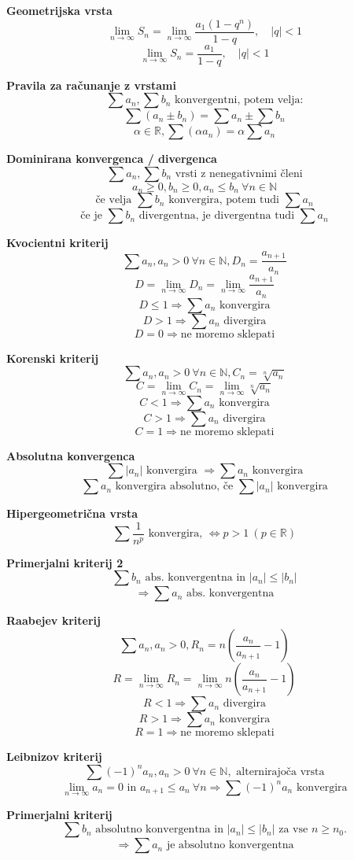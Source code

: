 \textbf{Geometrijska vrsta}
\[
	\lim_{n \to \infty} S_n = \lim_{n \to \infty} \frac{a_1(1-q^n)}{1-q}, \quad |q|<1
\]
\[
	\lim_{n \to \infty} S_n = \frac{a_1}{1-q}, \quad |q|<1
\]

\textbf{Pravila za računanje z vrstami}
\[
	\sum a_n, \sum b_n \text{ konvergentni, potem velja:}
\]
\[
	\sum (a_n \pm b_n) = \sum a_n \pm \sum b_n
\]
\[
	\alpha \in \mathbb{R}, \sum (\alpha a_n) = \alpha \sum a_n
\]

\textbf{Dominirana konvergenca / divergenca}
\[
	\sum a_n, \sum b_n \text{ vrsti z nenegativnimi členi}
\]
\[
	a_n \geq 0, b_n \geq 0, a_n \leq b_n \ \forall n \in \mathbb{N}
\]
\[
	\text{če velja } \sum b_n \text{ konvergira, potem tudi } \sum a_n
\]
\[
	\text{če je } \sum b_n \text{ divergentna, je divergentna tudi } \sum a_n
\]

\textbf{Kvocientni kriterij}
\[
	\sum a_n, a_n>0 \ \forall n \in \mathbb{N}, D_n = \frac{a_{n+1}}{a_n}
\]
\[
	D = \lim_{n \to \infty} D_n = \lim_{n \to \infty} \frac{a_{n+1}}{a_n}
\]
\[
	D \leq 1 \Rightarrow \sum a_n \text{ konvergira}
\]
\[
	D > 1 \Rightarrow \sum a_n \text{ divergira}
\]
\[
	D = 0 \Rightarrow \text{ne moremo sklepati}
\]

\textbf{Korenski kriterij}
\[
	\sum a_n, a_n>0 \ \forall n \in \mathbb{N}, C_n = \sqrt[n]{a_n}
\]
\[
	C = \lim_{n \to \infty} C_n = \lim_{n \to \infty} \sqrt[n]{a_n}
\]
\[
	C < 1 \Rightarrow \sum a_n \text{ konvergira}
\]
\[
	C > 1 \Rightarrow \sum a_n \text{ divergira}
\]
\[
	C = 1 \Rightarrow \text{ne moremo sklepati}
\]

\textbf{Absolutna konvergenca}
\[
	\sum |a_n| \text{ konvergira } \Rightarrow \sum a_n \text{ konvergira}
\]
\[
	\sum a_n \text{ konvergira absolutno, če } \sum |a_n| \text{ konvergira}
\]

\textbf{Hipergeometrična vrsta}
\[
	\sum \frac{1}{n^p} \text{ konvergira, } \Leftrightarrow p>1 \ (p \in \mathbb{R})
\]

\textbf{Primerjalni kriterij 2}
\[
	\sum b_n \text{ abs. konvergentna in } |a_n| \leq |b_n|
\]
\[
	\Rightarrow \sum a_n \text{ abs. konvergentna}
\]

\textbf{Raabejev kriterij}
\[
	\sum a_n, a_n>0, R_n = n \left( \frac{a_n}{a_{n+1}} - 1 \right)
\]
\[
	R = \lim_{n \to \infty} R_n = \lim_{n \to \infty} n \left( \frac{a_n}{a_{n+1}} - 1 \right)
\]
\[
	R < 1 \Rightarrow \sum a_n \text{ divergira}
\]
\[
	R > 1 \Rightarrow \sum a_n \text{ konvergira}
\]
\[
	R = 1 \Rightarrow \text{ne moremo sklepati}
\]

\textbf{Leibnizov kriterij}
\[
	\sum (-1)^n a_n, a_n>0 \ \forall n \in \mathbb{N}, \text{ alternirajoča vrsta}
\]
\[
	\lim_{n \to \infty} a_n = 0 \text{ in } a_{n+1} \leq a_n \ \forall n \Rightarrow \sum (-1)^n a_n \text{ konvergira}
\]

\textbf{Primerjalni kriterij}
\[
	\sum b_n \text{ absolutno konvergentna in } |a_n| \leq |b_n| \text{ za vse } n \geq n_0.
\]
\[
	\Rightarrow \sum a_n \text{ je absolutno konvergentna}
\]
